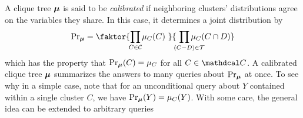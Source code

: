 A clique tree
$\boldsymbol\mu$ 
is said to be \emph{calibrated} if neighboring clusters' distributions agree on the variables 
they share.
In this case, 
it determines a joint distribution by
\vspace{-0.2ex}
\begin{equation}
    \Pr\nolimits_{\bmu} = \faktor
        {\prod_{\mathclap{C \in \cal C}} \mu_C(C)~}
        {~\prod_{\mathclap{(C{-}D) \mathrlap{\in \cal T}}} \mu_{C}(C \cap D)}
    \label{eq:cliquedist}
    \vspace{-0.2ex}
\end{equation}
which has the property that $\Pr_{\boldsymbol\mu}(C) = \mu_C$ for 
all
$C \in \C$.
\ifvfull
A calibrated clique tree $\boldsymbol\mu$ summarizes the answers to 
many queries about $\Pr_{\boldsymbol\mu}$ at once. 
To see why
in a simple case, note that 
for an unconditional query about $Y$ contained within a single cluster $C$, we have
$\Pr_{\boldsymbol\mu}(Y) = \mu_C(Y)$.
%
With some care, the general idea can be extended to arbitrary queries 
